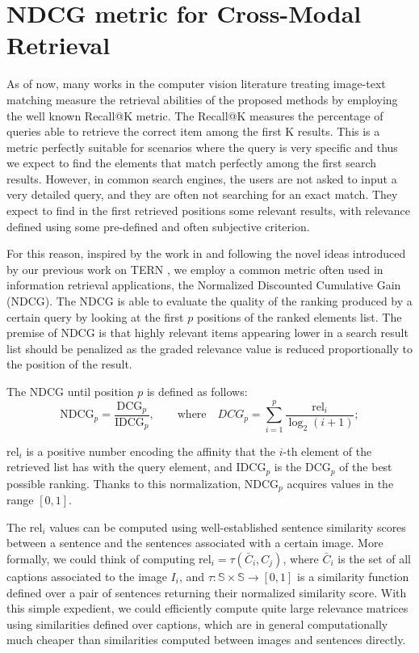 \documentclass[acmsmall]{acmart}
\begin{document}
\section{NDCG metric for Cross-Modal Retrieval}
\label{sec:computing_rel}
As of now, many works in the computer vision literature treating image-text matching measure the retrieval abilities of the proposed methods by employing the well known Recall@K metric. The Recall@K measures the percentage of queries able to retrieve the correct item among the first K results. 
This is a metric perfectly suitable for scenarios where the query is very specific and thus we expect to find the elements that match perfectly among the first search results.
However, in common search engines, the users are not asked to input a very detailed query, and they are often not searching for an exact match. They expect to find in the first retrieved positions some relevant results, with relevance defined using some pre-defined and often subjective criterion.




For this reason, inspired by the work in \cite{carrara2018pictureit} and following the novel ideas introduced by our previous work on TERN \cite{messina2020tern}, we employ a common metric often used in information retrieval applications, the Normalized Discounted Cumulative Gain (NDCG).
The NDCG is able to evaluate the quality of the ranking produced by a certain query by looking at the first $p$ positions of the ranked elements list. 
The premise of NDCG is that highly relevant items appearing lower in a search result list should be penalized as the graded relevance value is reduced proportionally to the position of the result.

The NDCG until position $p$ is defined as follows:
\begin{equation}
    \text{NDCG}_{p} = \frac{\text{DCG}_p}{\text{IDCG}_p}, \qquad \text{where} \quad DCG_{p} = \sum _{i=1}^{p}{\frac {\text{rel}_{i}}{\log _{2}(i+1)}};
\end{equation}

$\text{rel}_i$ is a positive number encoding the affinity that the $i$-th element of the retrieved list has with the query element, and $\text{IDCG}_p$ is the $\text{DCG}_p$ of the best possible ranking. Thanks to this normalization, $\text{NDCG}_p$ acquires values in the range $[0, 1]$. 





The $\text{rel}_i$ values can be computed using well-established sentence similarity scores between a sentence and the sentences associated with a certain image.
More formally, we could think of computing $\text{rel}_i = \tau(\bar{C}_i, C_j)$, where $\bar{C}_i$ is the set of all captions associated to the image $I_i$, and $\tau : \mathbb{S} \times \mathbb{S} \rightarrow [0, 1] $ is a similarity function defined over a pair of sentences returning their normalized similarity score.
With this simple expedient, we could efficiently compute quite large relevance matrices using similarities defined over captions, which are in general computationally much cheaper than similarities computed between images and sentences directly.
\end{document}
